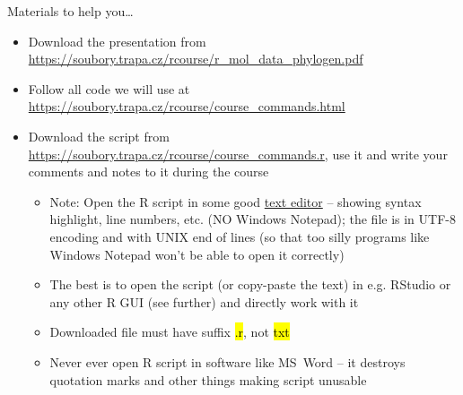 \documentclass[compress, ucs, xelatex, 11pt, xcolor=svgnames,
  hyperref={
    bookmarks=true,
    unicode=true,
    colorlinks=true,
    pdftitle={Molecular data in R},
    plainpages=false,
    pdfauthor={Vojtech Zeisek},
    pdfsubject={Course about phylogeny and evolution in R},
    pdfcreator={XeLaTeX},
    pdfkeywords={R, evolution, phylogeny, molecular data},
    linkcolor=Tomato,
    anchorcolor=SaddleBrown,
    citecolor=Goldenrod,
    filecolor=DarkMagenta,
    menucolor=Sienna,
    urlcolor=DarkTurquoise,
    pdftex},
  url={hyphens, lowtilde} %
  ]{beamer}
\renewcommand{\texttt}[1]{\hl{\ttfamily #1}}
\begin{document}
\begin{frame}{Materials to help you\ldots}
  \begin{itemize}
    \item Download the presentation from \url{https://soubory.trapa.cz/rcourse/r_mol_data_phylogen.pdf}
    \item Follow all code we will use at \url{https://soubory.trapa.cz/rcourse/course_commands.html}
    \item Download the script from \url{https://soubory.trapa.cz/rcourse/course_commands.r}, use it and write your comments and notes to it during the course
    \begin{itemize}
      \item \alert{Note:} Open the R script in some \alert{good} \href{http://texteditors.org/cgi-bin/wiki.pl?PickingATextEditor}{text editor} -- showing syntax highlight, line numbers, etc. (\alert{NO} Windows Notepad); the file is in UTF-8 encoding and with UNIX end of lines (so that too silly programs like Windows Notepad won't be able to open it correctly)
      \item The best is to open the script (or copy-paste the text) in e.g. RStudio or any other R GUI (see further) and directly work with it
      \item \alert{Downloaded file must have suffix \texttt{*.r}, not \texttt{*txt}}
      \item \alert{Never ever} open R script in software like MS~Word -- it destroys quotation marks and other things making script unusable
    \end{itemize}
  \end{itemize}
\end{frame}
\end{document}
